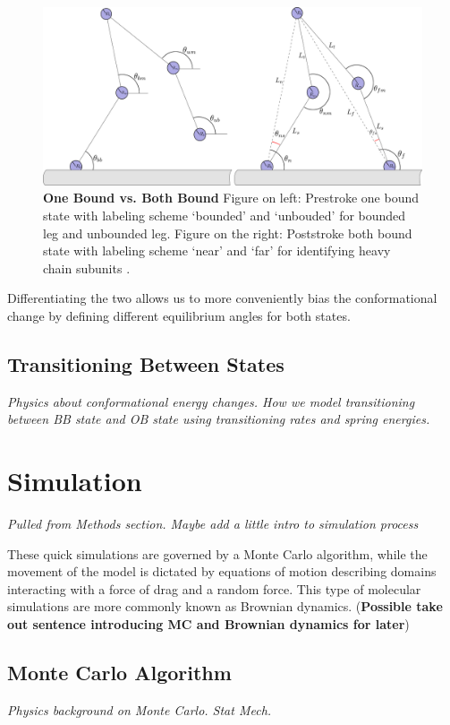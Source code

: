 \begin{figure}[H]
	\centering
	\includegraphics[width=0.8\columnwidth]{Figures/OB_vs_BB.PNG}
	\caption[One Bound vs. Both Bound]{\textbf{One Bound vs. Both Bound} Figure on left: Prestroke one bound state with labeling scheme ‘bounded’ and ‘unbouded’ for bounded leg and unbounded leg. Figure on the right: Poststroke both bound state with labeling scheme ‘near’ and ‘far’ for identifying heavy chain subunits \cite{Capek2017}.}
	\label{fig:final_disp}
\end{figure}

Differentiating the two allows us to more conveniently bias the conformational change by defining different equilibrium angles for both states.  


\subsection{Transitioning Between States}
\textit{Physics about conformational energy changes. How we model transitioning between BB state and OB state using transitioning rates and spring energies.}


\section{Simulation}
\textit{Pulled from Methods section. Maybe add a little intro to simulation process}
\par
These quick simulations are governed by a Monte Carlo algorithm, while the movement of the model is dictated by equations of motion describing domains interacting with a force of drag and a random force. This type of molecular simulations are more commonly known as Brownian dynamics. (\textbf{Possible take out sentence introducing MC and Brownian dynamics for later})


\subsection{Monte Carlo Algorithm}
\textit{Physics background on Monte Carlo. Stat Mech. }


